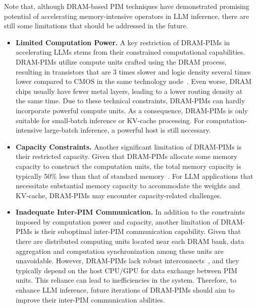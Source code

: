 Note that, although DRAM-based PIM techniques have demonstrated promising potential of  accelerating memory-intensive operators in LLM inference, there are still some limitations that should be addressed in the future. 

\begin{itemize}
\item \textbf{Limited Computation Power.} A key restriction of DRAM-PIMs in accelerating LLMs  stems from their constrained computational capabilities. DRAM-PIMs utilize compute units crafted using the DRAM process, resulting in transistors that are 3 times slower and logic density several times lower compared to CMOS in the same technology node~\cite{devaux2019true}. Even worse, DRAM chips usually have fewer metal layers, leading to a lower routing density at the same time. Due to these technical constraints, DRAM-PIMs can hardly incorporate powerful compute units. As a consequence, DRAM-PIMs is only suitable for small-batch inference or KV-cache processing. For computation-intensive large-batch inference, a powerful host is still necessary.

\item \textbf{Capacity Constraints.} Another significant limitation of DRAM-PIMs is their restricted capacity. Given that DRAM-PIMs allocate some memory capacity to construct the computation units, the total memory capacity is typically 50\% less than that of standard memory~\cite{hbm-pim}. For LLM applications that necessitate substantial memory capacity to accommodate the weights and KV-cache, DRAM-PIMs may encounter capacity-related challenges.

   \item \textbf{Inadequate Inter-PIM Communication.} In addition to the constraints imposed by computation power and capacity, another limitation of DRAM-PIMs  is their suboptimal inter-PIM communication capability. Given that there are distributed computing units located near each DRAM bank, data aggregation and computation synchronization among these units are unavoidable. However, DRAM-PIMs lack robust interconnects~\cite{zhou2023dimm,jonatan2024scalability}, and they typically depend on the host CPU/GPU for data exchange between PIM units. This reliance can lead to inefficiencies in the system. Therefore, to enhance LLM inference, future iterations of DRAM-PIMs should aim to improve their inter-PIM communication abilities.
\end{itemize}



 



